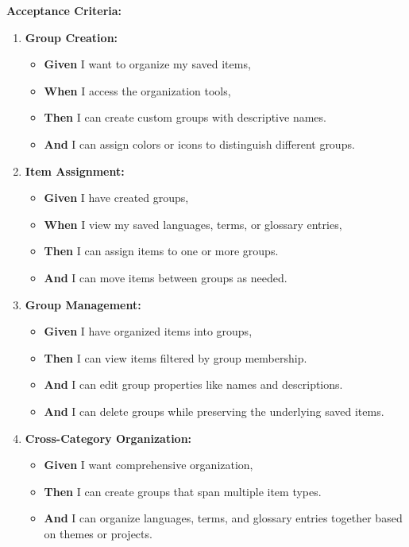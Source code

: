 \documentclass[12pt]{article}
\begin{document}
\vspace{1em}
\textbf{Acceptance Criteria:}
\begin{enumerate}
    \item \textbf{Group Creation:}
    \begin{itemize}
        \item \textbf{Given} I want to organize my saved items,
        \item \textbf{When} I access the organization tools,
        \item \textbf{Then} I can create custom groups with descriptive names.
        \item \textbf{And} I can assign colors or icons to distinguish different groups.
    \end{itemize}

    \item \textbf{Item Assignment:}
    \begin{itemize}
        \item \textbf{Given} I have created groups,
        \item \textbf{When} I view my saved languages, terms, or glossary entries,
        \item \textbf{Then} I can assign items to one or more groups.
        \item \textbf{And} I can move items between groups as needed.
    \end{itemize}

    \item \textbf{Group Management:}
    \begin{itemize}
        \item \textbf{Given} I have organized items into groups,
        \item \textbf{Then} I can view items filtered by group membership.
        \item \textbf{And} I can edit group properties like names and descriptions.
        \item \textbf{And} I can delete groups while preserving the underlying saved items.
    \end{itemize}

    \item \textbf{Cross-Category Organization:}
    \begin{itemize}
        \item \textbf{Given} I want comprehensive organization,
        \item \textbf{Then} I can create groups that span multiple item types.
        \item \textbf{And} I can organize languages, terms, and glossary entries together based on themes or projects.
    \end{itemize}
\end{enumerate}
\end{document}
